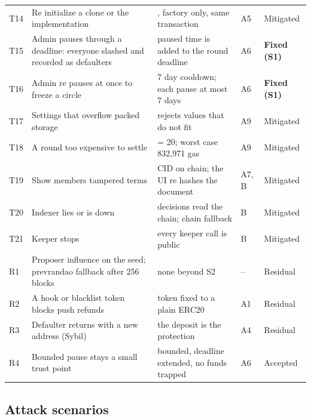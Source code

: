 {\begin{xltabular}{\textwidth}{@{}P{0.7cm}P{4.2cm}LP{1.0cm}P{1.6cm}@{}}
T14 & Re initialize a clone or the implementation & , factory only, same transaction & A5 & Mitigated \\
T15 & Admin pauses through a deadline: everyone slashed and recorded as defaulters & paused time is added to the round deadline & A6 & \textbf{Fixed (S1)} \\
T16 & Admin re pauses at once to freeze a circle & 7 day cooldown; each pause at most 7 days & A6 & \textbf{Fixed (S1)} \\
T17 & Settings that overflow packed storage &  rejects values that do not fit & A9 & Mitigated \\
T18 & A round too expensive to settle &  = 20; worst case 832,971 gas & A9 & Mitigated \\
T19 & Show members tampered terms & CID on chain; the UI re hashes the document & A7, B & Mitigated \\
T20 & Indexer lies or is down & decisions read the chain; chain fallback & B & Mitigated \\
T21 & Keeper stops & every keeper call is public & B & Mitigated \\
R1 & Proposer influence on the seed; prevrandao fallback after 256 blocks & none beyond S2 & -- & Residual \\
R2 & A hook or blacklist token blocks push refunds & token fixed to a plain ERC20 & A1 & Residual \\
R3 & Defaulter returns with a new address (Sybil) & the deposit is the protection & A4 & Residual \\
R4 & Bounded pause stays a small trust point & bounded, deadline extended, no funds trapped & A6 & Accepted \\
\end{xltabular}
}

\subsection{Attack scenarios}

